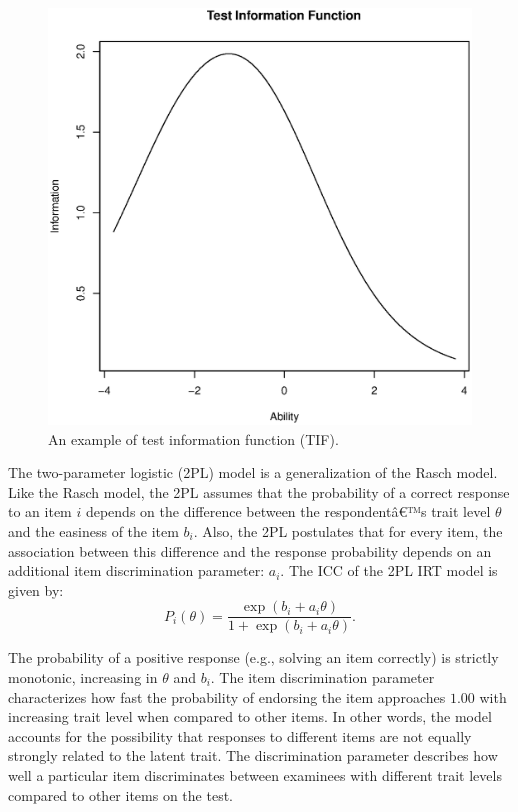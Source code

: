 \begin{figure}[H]
	\centering
	\includegraphics[scale=0.5]{tif.eps}
	\caption{An example of test information function (TIF).}
	\label{fig:tif}
\end{figure}

The two-parameter logistic (2PL) model \parencite{birnbaum1958} is a generalization of the Rasch model. Like the Rasch model, the 2PL assumes that the probability of a correct response to an item $i$ depends on the difference between the respondentâ€™s trait level $\theta$ and the easiness of the item $b_i$. Also, the 2PL postulates that for every item, the association between this difference and the response probability depends on an additional item discrimination parameter: $a_i$. 
The ICC of the 2PL IRT model is given by:
\begin{equation}
P_i(\theta)=\frac{\exp(b_i+a_i\theta)}{1+ \exp(b_i+a_i\theta)}.
\end{equation}

The probability of a positive response (e.g., solving an item correctly) is strictly monotonic, increasing in $\theta$ and $b_i$. The item discrimination parameter characterizes how fast the probability of endorsing the item approaches $1.00$ with increasing trait level when compared to other items. In other words, the model accounts for the possibility that responses to different items are not equally strongly related to the latent trait. The discrimination parameter describes how well a particular item discriminates between examinees with different trait levels compared to other items on the test. 

